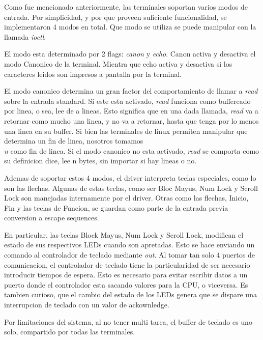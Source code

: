 \documentclass[a4paper,10pt]{article}
\begin{document}
            Como fue mencionado anteriormente, las terminales soportan varios modos de entrada.
            Por simplicidad, y por que proveen suficiente funcionalidad, se implementaron 4 modos en total.
            Que modo se utiliza se puede manipular con la llamada \textit{ioctl}.

            El modo esta determinado por 2 flags: \textit{canon} y \textit{echo}.
            Canon activa y desactiva el modo Canonico de la terminal.
            Mientra que echo activa y desactiva si los caracteres leidos son impresos a pantalla por la terminal.

            El modo canonico determina un gran factor del comportamiento de llamar a \textit{read} sobre la entrada standard.
            Si este esta activado, \textit{read} funciona como buffereado por linea, o sea, lee de a lineas.
            Esto significa que en una dada llamada, \textit{read} va a retornar como mucho una linea, y no va a retornar, hasta que tenga por lo menos una linea en su buffer.
            Si bien las terminales de linux permiten manipular que determina un fin de linea, nosotros tomamos \textit{\\n} como fin de linea.
            Si el modo canonico no esta activado, \textit{read} se comporta como su definicion dice, lee n bytes, sin importar si hay lineas o no.

            Ademas de soportar estos 4 modos, el driver interpreta teclas especiales, como lo son las flechas.
            Algunas de estas teclas, como ser Bloc Mayus, Num Lock y Scroll Lock son manejadas internamente por el driver.
            Otras como las flechas, Inicio, Fin y las teclas de Funcion, se guardan como parte de la entrada previa conversion a escape sequences.

            En particular, las teclas Block Mayus, Num Lock y Scroll Lock, modifican el estado de sus respectivos LEDs cuando son apretadas.
            Esto se hace enviando un comando al controlador de teclado mediante \textit{out}. 
            Al tomar tan solo 4 puertos de comunicacion, el controlador de teclado tiene la particularidad de ser necesario introducir tiempos de espera.
            Esto es necesario para evitar escribir datos a un puerto donde el controlador esta sacando valores para la CPU, o viceversa.
            Es tambien curioso, que el cambio del estado de los LEDs genera que se dispare una interrupcion de teclado con un valor de ackownledge.

            Por limitaciones del sistema, al no tener multi tarea, el buffer de teclado es uno solo, compartido por todas las terminales.
\end{document}
